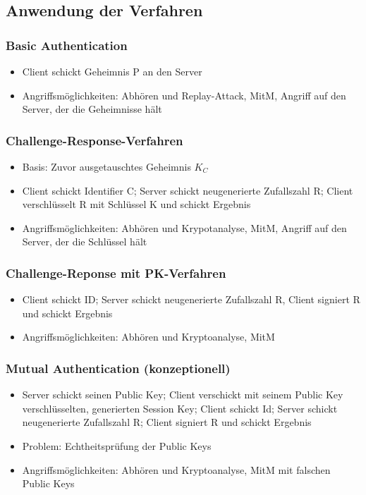 \subsection{Anwendung der Verfahren}

\subsubsection{Basic Authentication}
\begin{itemize}
	\item Client schickt Geheimnis P an den Server
	\item Angriffsmöglichkeiten: Abhören und Replay-Attack, MitM, Angriff auf den Server, der die Geheimnisse hält
\end{itemize}

\subsubsection{Challenge-Response-Verfahren}
\begin{itemize}
	\item Basis: Zuvor ausgetauschtes Geheimnis $K_C$
	\item Client schickt Identifier C; Server schickt neugenerierte Zufallszahl R; Client verschlüsselt R mit Schlüssel K und schickt Ergebnis
	\item Angriffsmöglichkeiten: Abhören und Krypotanalyse, MitM, Angriff auf den Server, der die Schlüssel hält
\end{itemize}

\subsubsection{Challenge-Reponse mit PK-Verfahren}
\begin{itemize}
	\item Client schickt ID; Server schickt neugenerierte Zufallszahl R, Client signiert R und schickt Ergebnis
	\item Angriffsmöglichkeiten: Abhören und Kryptoanalyse, MitM
\end{itemize}

\subsubsection{Mutual Authentication (konzeptionell)}
\begin{itemize}
	\item Server schickt seinen Public Key; Client verschickt mit seinem Public Key verschlüsselten, generierten Session Key; Client schickt Id; Server schickt neugenerierte Zufallszahl R; Client signiert R und schickt Ergebnis
	\item Problem: Echtheitsprüfung der Public Keys
	\item Angriffsmöglichkeiten: Abhören und Kryptoanalyse, MitM mit falschen Public Keys
\end{itemize}

